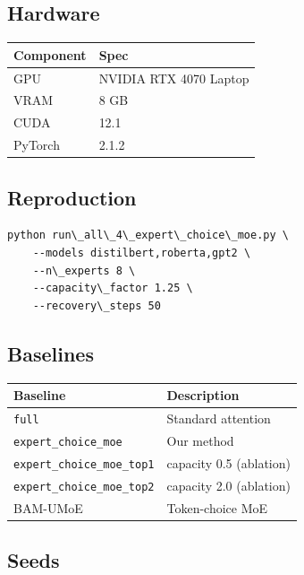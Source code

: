 \subsection{Hardware}

\begin{table}[H]
\centering
\small
\begin{tabular}{ll}
\toprule
\textbf{Component} & \textbf{Spec} \\
\midrule
GPU & NVIDIA RTX 4070 Laptop \\
VRAM & 8 GB \\
CUDA & 12.1 \\
PyTorch & 2.1.2 \\
\bottomrule
\end{tabular}
\end{table}

\subsection{Reproduction}

\begin{lstlisting}
python run\_all\_4\_expert\_choice\_moe.py \
    --models distilbert,roberta,gpt2 \
    --n\_experts 8 \
    --capacity\_factor 1.25 \
    --recovery\_steps 50
\end{lstlisting}

\subsection{Baselines}

\begin{table}[H]
\centering
\small
\begin{tabular}{ll}
\toprule
\textbf{Baseline} & \textbf{Description} \\
\midrule
\texttt{full} & Standard attention \\
\texttt{expert\_choice\_moe} & Our method \\
\texttt{expert\_choice\_moe\_top1} & capacity 0.5 (ablation) \\
\texttt{expert\_choice\_moe\_top2} & capacity 2.0 (ablation) \\
BAM-UMoE & Token-choice MoE \\
\bottomrule
\end{tabular}
\end{table}

\subsection{Seeds}

